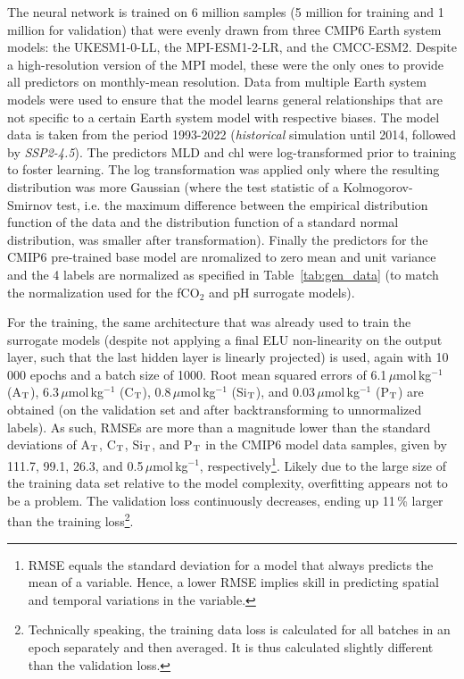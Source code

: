 \documentclass{article}
\begin{document}
	The neural network is trained on 6 million samples (5 million for training and 1 million for validation) that were evenly drawn from three CMIP6 Earth system models: the UKESM1-0-LL, the MPI-ESM1-2-LR, and the CMCC-ESM2. Despite a high-resolution version of the MPI model, these were the only ones to provide all predictors on monthly-mean resolution. Data from multiple Earth system models were used to ensure that the model learns general relationships that are not specific to a certain Earth system model with respective biases. The model data is taken from the period 1993-2022 (\textit{historical} simulation until 2014, followed by \textit{SSP2-4.5}). The predictors MLD and chl were log-transformed prior to training to foster learning. The log transformation was applied only where the resulting distribution was more Gaussian (where the test statistic of a Kolmogorov-Smirnov test, i.e. the maximum difference between the empirical distribution function of the data and the distribution function of a standard normal distribution, was smaller after transformation). 
	Finally the predictors for the CMIP6 pre-trained base model are nromalized to zero mean and unit variance and the 4 labels are normalized as specified in Table~\ref{tab:gen_data} (to match the normalization used for the fCO$_2$ and pH surrogate models).
	
	For the training, the same architecture that was already used to train the surrogate models (despite not applying a final ELU non-linearity on the output layer, such that the last hidden layer is linearly projected) is used, again with 10\,000 epochs and a batch size of 1000. Root mean squared errors of 6.1\,$\mu$mol\,kg$^{-1}$ (A$_\textup{T}$), 6.3\,$\mu$mol\,kg$^{-1}$ (C$_\textup{T}$), 0.8\,$\mu$mol\,kg$^{-1}$ (Si$_\textup{T}$), and 0.03\,$\mu$mol\,kg$^{-1}$ (P$_\textup{T}$) are obtained (on the validation set and after backtransforming to unnormalized labels). As such, RMSEs are more than a magnitude lower than the standard deviations of A$_\textup{T}$, C$_\textup{T}$, Si$_\textup{T}$, and P$_\textup{T}$ in the CMIP6 model data samples, given by 111.7, 99.1, 26.3, and 0.5\,$\mu$mol\,kg$^{-1}$, respectively\footnote{RMSE equals the standard deviation for a model that always predicts the mean of a variable. Hence, a lower RMSE implies skill in predicting spatial and temporal variations in the variable.}. Likely due to the large size of the training data set relative to the model complexity, overfitting appears not to be a problem. The validation loss continuously decreases, ending up 11\,\% larger than the training loss\footnote{Technically speaking, the training data loss is calculated for all batches in an epoch separately and then averaged. It is thus calculated slightly different than the validation loss.}. %
	
\end{document}

